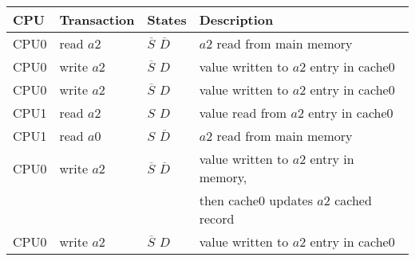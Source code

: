 \documentclass[a4paper,12pt]{article}
\begin{document}
\begin{tabular}{|l|l|l|l|}
\hline
CPU	&	Transaction	&	States	&	Description	\\
\hline
CPU0	&	read $a2$	&	$\overline{S}$ $\overline{D}$	&	$a2$ read from main memory						\\
\hline
CPU0	&	write $a2$	&	$\overline{S}$ $D$				&	value written to $a2$ entry in cache0		\\
\hline
CPU0	&	write $a2$	&	$\overline{S}$ $D$				&	value written to $a2$ entry in cache0		\\
\hline
CPU1	&	read $a2$	&	$S$ $D$								&	value read from $a2$ entry in cache0		\\
\hline
CPU1	&	read $a0$	&	$S$ $\overline{D}$				&	$a2$ read from main memory						\\
\hline
CPU0	&	write $a2$	&	$\overline{S}$ $\overline{D}$	&	value written to $a2$ entry in memory, \\
		&					&											&	then cache0 updates $a2$ cached record	\\
\hline
CPU0	&	write $a2$	&	$\overline{S}$ $D$				&	value written to $a2$ entry in cache0		\\
\hline
\end{tabular}
\end{document}
